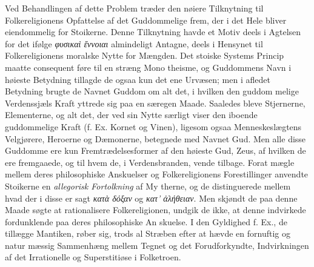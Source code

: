\documentclass[12pt,a4paper]{book}
\newcommand{\gk}[1]{\textit{#1}}
\begin{document}
Ved Behandlingen af dette Problem træder den nøiere
Tilknytning til Folkereligionens Opfattelse af det Guddommelige
frem, der i det Hele bliver eiendommelig for Stoikerne. Denne
Tilknytning havde et Motiv deels i Agtelsen for det ifølge
\gk{φυσικαὶ ἔννοιαι} almindeligt Antagne, deels i Hensynet til
Folkereligionens moralske Nytte for Mængden. Det stoiske
Systems Princip maatte consequent føre til en stræng Mono\-%
theisme, og Guddommens Navn i høieste Betydning tillagde
de ogsaa kun det ene Urvæsen; men i afledet Betydning
brugte de Navnet Guddom om alt det, i hvilken den guddom\-%
melige Verdenssjæls Kraft yttrede sig paa en særegen Maade.
Saaledes bleve Stjernerne, Elementerne, og alt det, der ved sin
Nytte særligt viser den iboende guddommelige Kraft (f. Ex.
Kornet og Vinen), ligesom ogsaa Menneskeslægtens Velgjørere,
Heroerne og Dæmonerne, betegnede med Navnet Gud. Men
alle disse Guddomme ere kun Fremtrædelsesformer af den
høieste Gud, Zeus, af hvilken de ere fremgaaede, og til hvem
de, i Verdensbranden, vende tilbage. Forat mægle mellem
deres philosophiske Anskuelser og Folkereligionens Forestillinger
anvendte Stoikerne en \emph{allegorisk Fortolkning} af My\-%
therne, og de distinguerede mellem hvad der i disse er sagt
\gk{κατὰ δόξαν} og \gk{κατ' ἀλήθειαν}. Men skjøndt de paa denne
Maade søgte at rationalisere Folkereligionen, undgik de ikke,
at denne indvirkede fordunklende paa deres philosophiske An\-%
skuelse. I den Gyldighed f. Ex., de tillægge Mantiken, røber
sig, trods al Stræben efter at hævde en fornuftig og natur\-%
mæssig Sammenhæng mellem Tegnet og det Forudforkyndte,
Indvirkningen af det Irrationelle og Superstitiøse i Folketroen.
\end{document}
